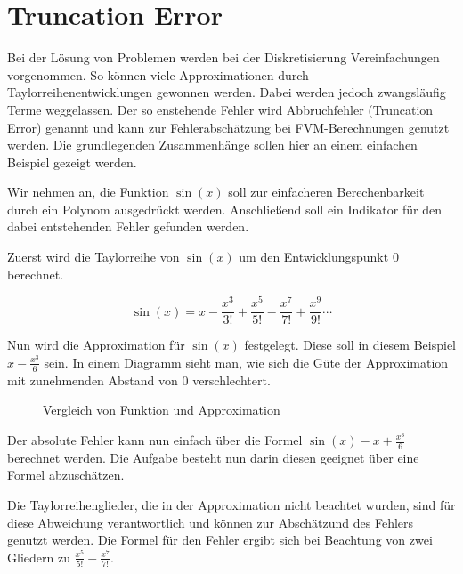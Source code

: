 \documentclass[11pt, ngerman,colorback,accentcolor=tud2d]{tudreport}
\begin{document}
\chapter{Truncation Error}

Bei der Lösung von Problemen werden bei der Diskretisierung Vereinfachungen vorgenommen.
So können viele Approximationen durch Taylorreihenentwicklungen gewonnen werden. Dabei
werden jedoch zwangsläufig Terme weggelassen. Der so enstehende Fehler wird
Abbruchfehler (Truncation Error) genannt und kann zur Fehlerabschätzung bei FVM-Berechnungen
genutzt werden. Die grundlegenden Zusammenhänge sollen hier an einem einfachen
Beispiel gezeigt werden.

Wir nehmen an, die Funktion $\sin(x)$ soll zur einfacheren Berechenbarkeit durch
ein Polynom ausgedrückt werden. Anschließend soll ein Indikator für den dabei
entstehenden Fehler gefunden werden.

Zuerst wird die Taylorreihe von $\sin(x)$ um den Entwicklungspunkt $0$ berechnet.

\begin{equation}
  \sin(x) = x-\frac{x^3}{3!} +\frac{x^5}{5!} -\frac{x^7}{7!} +\frac{x^9}{9!}\cdots
\end{equation}

Nun wird die Approximation für $\sin(x)$ festgelegt. Diese soll in diesem Beispiel
$x-\frac{x^3}{6} $ sein. In einem Diagramm sieht man, wie sich die Güte der
Approximation mit zunehmenden Abstand von $0$ verschlechtert.

\begin{figure}[ht]
\centering
\caption{Vergleich von Funktion und Approximation}
\end{figure}


Der absolute Fehler kann nun einfach über die Formel $\sin(x) - x + \frac{x^3}{6}$
berechnet werden. Die Aufgabe besteht nun darin diesen geeignet über eine Formel abzuschätzen.

Die Taylorreihenglieder, die in der Approximation nicht beachtet wurden, sind für diese
Abweichung verantwortlich und können zur Abschätzund des Fehlers genutzt werden.
Die Formel für den Fehler ergibt sich bei Beachtung von zwei Gliedern zu
$\frac{x^5}{5!} -\frac{x^7}{7!} $.
\end{document}
